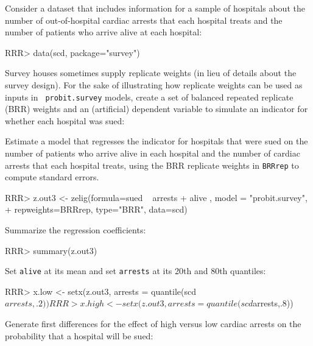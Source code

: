 \begin{enumerate}
Consider a dataset that includes information for a sample of hospitals
about the number of out-of-hospital cardiac arrests that each
hospital treats and the number of patients who arrive alive
at each hospital: 
\begin{Schunk}
\begin{Sinput}
RRR> data(scd, package="survey") 
\end{Sinput}
\end{Schunk}
Survey houses sometimes supply
replicate weights (in lieu of details about the survey design).  For the sake
of illustrating how replicate weights can be used as inputs in {\tt
probit.survey} models, create a set of balanced repeated replicate
(BRR) weights and an (artificial) dependent variable to simulate an indicator 
for whether each hospital was sued:
\begin{Schunk}
\end{Schunk}
Estimate a model that regresses the indicator for hospitals that were
sued on the number of patients who arrive alive in
each hospital and the number of cardiac arrests that each hospital treats, using
the BRR replicate weights in {\tt BRRrep} to compute standard errors.
\begin{Schunk}
\begin{Sinput}
RRR> z.out3 <- zelig(formula=sued ~ arrests + alive , model = "probit.survey", 
+   repweights=BRRrep, type="BRR", data=scd)
\end{Sinput}
\end{Schunk}
Summarize the regression coefficients: 
\begin{Schunk}
\begin{Sinput}
RRR>  summary(z.out3)
\end{Sinput}
\end{Schunk}
Set {\tt alive} at its mean and set {\tt arrests} at its 20th and 80th quantiles:
\begin{Schunk}
\begin{Sinput}
RRR> x.low <- setx(z.out3, arrests = quantile(scd$arrests, .2))
RRR> x.high <- setx(z.out3, arrests = quantile(scd$arrests,.8)) 
\end{Sinput}
\end{Schunk}
Generate first
differences for the effect of high versus low cardiac arrests
on the probability that a hospital will be sued:

\end{enumerate}
